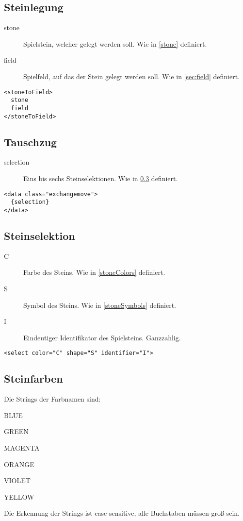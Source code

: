 \documentclass[12pt,a4paper, ngerman, oneside]{scrartcl}
\begin{document}
\subsection{Steinlegung}
\label{stoneToField}
\begin{description}
\item[stone] Spielstein, welcher gelegt werden soll. Wie in \ref{stone} definiert.
\item[field] Spielfeld, auf das der Stein gelegt werden soll. Wie in \ref{sec:field} definiert.
\end{description}
\begin{verbatim}
<stoneToField>
  stone
  field
</stoneToField>
\end{verbatim}

\subsection{Tauschzug}
\label{changeMove}
\begin{description}
\item[selection] Eins bis sechs Steinselektionen. Wie in \ref{sec:stoneSelection} definiert.
\end{description}
\begin{verbatim}
<data class="exchangemove">
  {selection}
</data>
\end{verbatim}

\subsection{Steinselektion}
\label{sec:stoneSelection}
\begin{description}
\item[C] Farbe des Steins. Wie in \ref{stoneColors} definiert.
\item[S] Symbol des Steins. Wie in \ref{stoneSymbols} definiert.
\item[I] Eindeutiger Identifikator des Spielsteins. Ganzzahlig.
\end{description}
\begin{verbatim}
<select color="C" shape="S" identifier="I">
\end{verbatim}

\subsection{\label{stoneColors}Steinfarben}
Die Strings der Farbnamen sind:
\begin{compactenum}
\item BLUE
\item GREEN
\item MAGENTA
\item ORANGE
\item VIOLET
\item YELLOW
\end{compactenum}
Die Erkennung der Strings ist case-sensitive, alle Buchstaben müssen groß
sein.
\end{document}
